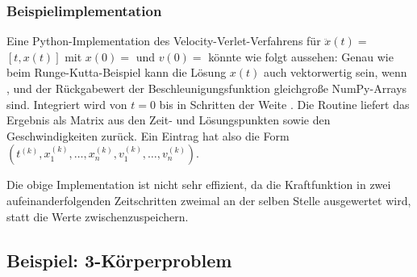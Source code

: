\subsubsection{Beispielimplementation}

Eine Python-Implementation des Velocity-Verlet-Verfahrens für $\ddot
x(t) = $$[t, x(t)]$ mit $x(0) =$  und $v(0) =$
 könnte wie folgt aussehen:%
%
Genau wie beim Runge-Kutta-Beispiel kann die Lösung $x(t)$ auch
vektorwertig sein, wenn ,  und der Rückgabewert der
Beschleunigungsfunktion  gleichgroße NumPy-Arrays
sind. Integriert wird von $t=0$ bis  in Schritten der Weite
. Die Routine liefert das Ergebnis als Matrix aus den Zeit-
und Lösungspunkten sowie den Geschwindigkeiten zurück. Ein Eintrag hat
also die Form $\left(t^{(k)}, x^{(k)}_1,\ldots,x^{(k)}_n,
v^{(k)}_1,\ldots,v^{(k)}_n\right)$.

Die obige Implementation ist nicht sehr effizient, da die
Kraftfunktion in zwei aufeinanderfolgenden Zeitschritten zweimal an
der selben Stelle ausgewertet wird, statt die Werte
zwischenzuspeichern.

\subsection{Beispiel: 3-Körperproblem}

